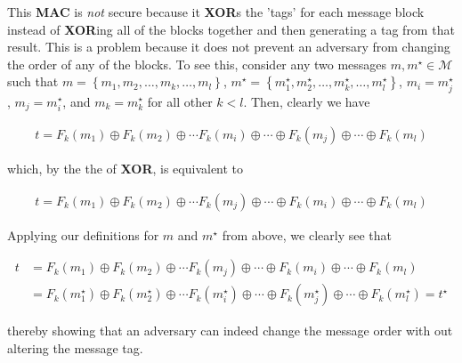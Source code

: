\documentclass[../midterm.tex]{subfiles}
\begin{document}
\begin{flushleft}




  This \textbf{MAC} is \emph{not} secure because it \textbf{XOR}s the 'tags' for each message block instead of \textbf{XOR}ing all of the blocks together and then generating a tag from that result.  This is a problem because it does not prevent an adversary from changing the order of any of the blocks.   To see this, consider any two messages $m, m^\star \in \mathcal{M}$ such that $m = \left\{ m_1, m_2, \dots, m_k, \dots, m_l \right\}$, $m^\star = \left\{ m_1^\star, m_2^\star, \dots, m_k^\star, \dots, m_l^\star \right\}$, $m_i = m^\star_j$, $m_j = m^\star_i$, and $m_k = m^\star_k$ for all other $k < l$.  Then, clearly we have

\begin{align*}
t = F_k \left( m_1 \right) \oplus F_k \left( m_2 \right) \oplus \cdots F_k \left( m_i \right) \oplus \cdots \oplus F_k \left( m_j \right) \oplus \cdots \oplus F_k \left( m_l \right)
\end{align*}

which, by the the of \textbf{XOR}, is equivalent to 

\begin{align*}
t = F_k \left( m_1 \right) \oplus F_k \left( m_2 \right) \oplus \cdots F_k \left( m_j \right) \oplus \cdots \oplus F_k \left( m_i \right) \oplus \cdots \oplus F_k \left( m_l \right)
\end{align*}

Applying our definitions for $m$ and $m^\star$ from above, we clearly see that

\begin{align*}
t &= F_k \left( m_1 \right) \oplus F_k \left( m_2 \right) \oplus \cdots F_k \left( m_j \right) \oplus \cdots \oplus F_k \left( m_i \right) \oplus \cdots \oplus F_k \left( m_l \right) \\
&= F_k \left( m^\star_1 \right) \oplus F_k \left( m^\star_2 \right) \oplus \cdots F_k \left( m^\star_i \right) \oplus \cdots \oplus F_k \left( m^\star_j \right) \oplus \cdots \oplus F_k \left( m^\star_l \right) = t^\star
\end{align*}

thereby showing that an adversary can indeed change the message order with out altering the message tag.



\end{flushleft}
\end{document}
